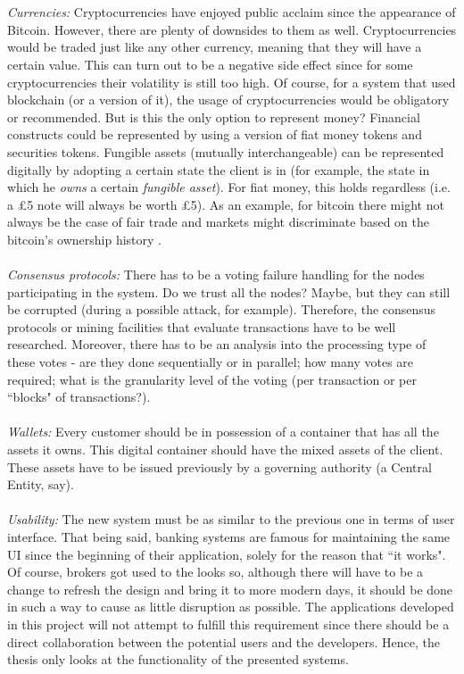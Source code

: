 \documentclass[12pt,twoside]{article}
\begin{document}
\\ \\
\textit{Currencies:} Cryptocurrencies have enjoyed public acclaim since the appearance of Bitcoin. However, there are plenty of downsides to them as well. Cryptocurrencies would be traded just like any other currency, meaning that they will have a certain value. This can turn out to be a negative side effect since for some cryptocurrencies their volatility is still too high. Of course, for a system that used blockchain (or a version of it), the usage of cryptocurrencies would be obligatory or recommended. But is this the only option to represent money? Financial constructs could be represented by using a version of fiat money tokens and securities tokens. Fungible assets (mutually interchangeable) can be represented digitally by adopting a certain state the client is in (for example, the state in which he \textit{owns} a certain \textit{fungible asset}). For fiat money, this holds regardless (i.e. a \pounds 5 note will always be worth \pounds 5). As an example, for bitcoin there might not always be the case of fair trade and markets might discriminate based on the bitcoin's ownership history \cite{BC:Fungibility}.
\\ \\
\textit{Consensus protocols:} There has to be a voting failure handling for the nodes participating in the system. Do we trust all the nodes? Maybe, but they can still be corrupted (during a possible attack, for example). Therefore, the consensus protocols or mining facilities that evaluate transactions have to be well researched. Moreover, there has to be an analysis into the processing type of these votes - are they done sequentially or in parallel; how many votes are required; what is the granularity level of the voting (per transaction or per ``blocks" of transactions?).
\\ \\
\textit{Wallets:} Every customer should be in possession of a container that has all the assets it owns. This digital container should have the mixed assets of the client. These assets have to be issued previously by a governing authority (a Central Entity, say). 
\\ \\
\textit{Usability:} The new system must be as similar to the previous one in terms of user interface. That being said, banking systems are famous for maintaining the same UI since the beginning of their application, solely for the reason that ``it works". Of course, brokers got used to the looks so, although there will have to be a change to refresh the design and bring it to more modern days, it should be done in such a way to cause as little disruption as possible. The applications developed in this project will not attempt to fulfill this requirement since there should be a direct collaboration between the potential users and the developers. Hence, the thesis only looks at the functionality of the presented systems.
\end{document}
